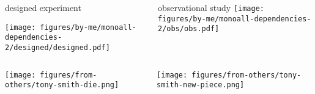 \documentclass{beamer}
\newcommand{\platefigscale}[0]{0.7}
\begin{document}
\begin{frame}[t, plain, label=orthogonality]
\begin{columns}[t]
\begin{column}{0.5\textwidth}
designed experiment

\texttt{[image: figures/by-me/monoall-dependencies-2/designed/designed.pdf]}

\end{column}

\begin{column}{0.5\textwidth}
observational study
\texttt{[image: figures/by-me/monoall-dependencies-2/obs/obs.pdf]}
\end{column}
\end{columns}
\vfill

\begin{columns}[t]
\begin{column}{0.5\textwidth}

\texttt{[image: figures/from-others/tony-smith-die.png]}
\end{column}

\begin{column}{0.5\textwidth}

\texttt{[image: figures/from-others/tony-smith-new-piece.png]}
\end{column}
\end{columns}
\end{frame}

\end{document}
